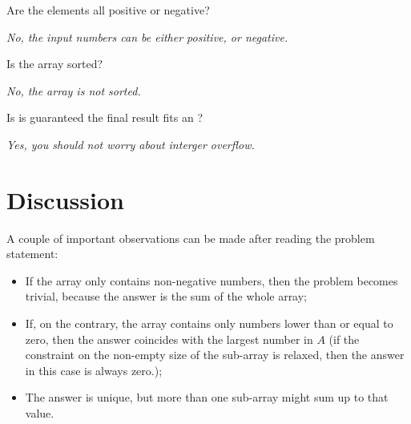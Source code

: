 \begin{QandA}
	\item \begin{questionitem} \begin{question} Are the elements all positive or negative?  \end{question} 	 
    \begin{answered}
		\textit{No, the input numbers can be either positive, or negative.}
	\end{answered} \end{questionitem}
	
	\item \begin{questionitem} \begin{question} Is the array sorted?  \end{question} 	 
    \begin{answered}
		\textit{No, the array is not sorted.}
	\end{answered} \end{questionitem}

	\item \begin{questionitem} \begin{question} Is is guaranteed the final result fits an ?  \end{question} 	 
    \begin{answered}
		\textit{Yes, you should not worry about interger overflow.}
	\end{answered} \end{questionitem}
	
\end{QandA}

\section{Discussion}
\label{max_sum_continguous_subarray:sec:discussion}
A couple of important observations can be made after reading the problem statement:
\begin{itemize}
	\item If the array only contains non-negative numbers, then the problem becomes trivial, because the answer is the sum of the whole array;
	\item If, on the contrary, the array contains only  numbers lower than or equal to zero, then the answer coincides with the largest number in $A$ (if the constraint on the non-empty size of the sub-array is relaxed, then the answer in this case is always zero.);
	\item  The answer is unique, but more than one sub-array might sum up to that value.
\end{itemize}

